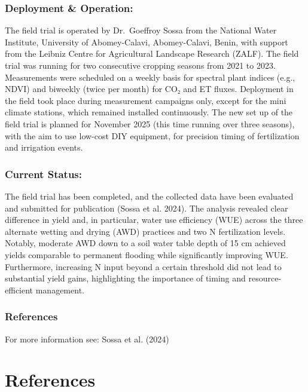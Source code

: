 \documentclass[
  11pt,
  letterpaper,
]{book}
\begin{document}
\subsection{Deployment \& Operation:}\label{sec-benin-hub-deployment}

The field trial is operated by Dr.~Goeffroy Sossa from the National
Water Institute, University of Abomey-Calavi, Abomey-Calavi, Benin, with
support from the Leibniz Centre for Agricultural Landscape Research
(ZALF). The field trial was running for two consecutive cropping seasons
from 2021 to 2023. Measurements were scheduled on a weekly basis for
spectral plant indices (e.g., NDVI) and biweekly (twice per month) for
CO₂ and ET fluxes. Deployment in the field took place during measurement
campaigns only, except for the mini climate stations, which remained
installed continuously. The new set up of the field trial is planned for
November 2025 (this time running over three seasons), with the aim to
use low-cost DIY equipment, for precision timing of fertilization and
irrigation events.

\subsection{Current Status:}\label{sec-benin-hub-status}

The field trial has been completed, and the collected data have been
evaluated and submitted for publication (Sossa et al. 2024). The
analysis revealed clear difference in yield and, in particular, water
use efficiency (WUE) across the three alternate wetting and drying (AWD)
practices and two N fertilization levels. Notably, moderate AWD down to
a soil water table depth of 15 cm achieved yields comparable to
permanent flooding while significantly improving WUE. Furthermore,
increasing N input beyond a certain threshold did not lead to
substantial yield gains, highlighting the importance of timing and
resource-efficient management.

\subsection{References}\label{sec-benin-hub-references}

For more information see: Sossa et al. (2024)


\chapter*{References}\label{references}
\end{document}
